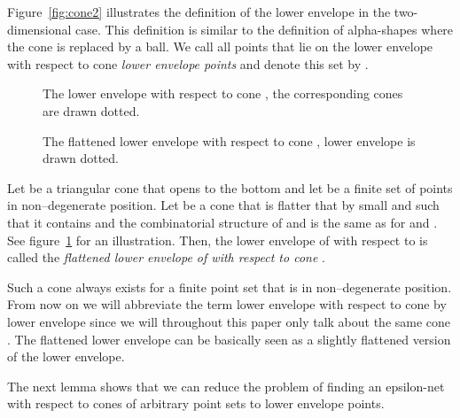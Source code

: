 \documentclass{stacs_proc}
\begin{document}
Figure~\ref{fig:cone2} illustrates the definition of the lower envelope
in the two-dimensional case.
This definition is similar to the definition of alpha-shapes where
the cone is replaced by a ball.
We call all points that lie on the lower envelope with respect to cone
 \emph{lower envelope points} and denote this set by . 
\begin{figure}[h]
\begin{minipage}{0.49\textwidth}
  \begin{center}
    \vspace{-3ex}
    \caption{The lower envelope with respect to cone , the
      corresponding cones are drawn dotted.} 
    \label{fig:cone2}
  \end{center}
\end{minipage}\hfill
\begin{minipage}{0.49\textwidth}
  \begin{center}
     \vspace{-3ex}
    \caption{The flattened lower envelope with respect to cone ,
      lower envelope is drawn dotted.} 
    \label{fig:cone3}
  \end{center}
\end{minipage}
\end{figure}

\begin{defi}
  Let  be a triangular cone that opens to the bottom and let  be a finite set of points in non--degenerate position. Let
   be a cone that is flatter that  by small  and such that
  it contains  and the combinatorial structure of  and  is
  the same as for  and . See figure~\ref{fig:cone3} for an
  illustration. Then, the lower envelope of  with respect to 
  is called the \emph{flattened lower envelope of  with respect to cone }.
\end{defi}
Such a cone  always exists for a finite point set that is in
non--degenerate position.
From now on we will abbreviate the term lower envelope with respect to
cone  by lower envelope since we will throughout this paper only
talk about the same cone . The flattened lower envelope can  be
basically seen as a slightly flattened version of the lower envelope.



The next lemma shows that we can reduce the problem of finding an
epsilon-net with respect to cones of arbitrary point sets to lower
envelope points.
\end{document}
